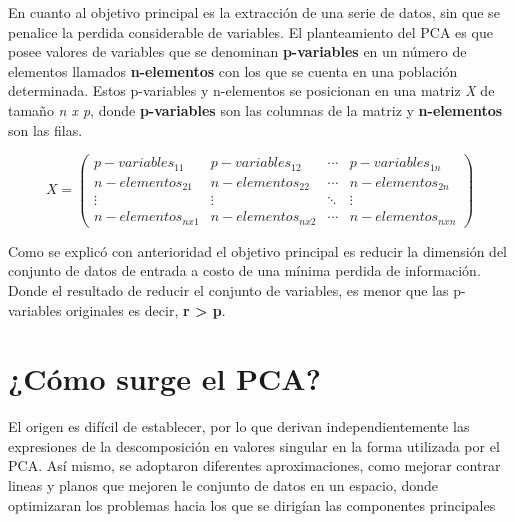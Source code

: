 En cuanto al objetivo principal es la extracción de una serie de datos, sin que se penalice la perdida considerable de variables. El planteamiento del PCA es que posee valores de variables que se denominan \textbf{p-variables} en un número de elementos llamados \textbf{n-elementos} con los que se cuenta en una población determinada. Estos p-variables y n-elementos se posicionan en una matriz \textit{X} de tamaño \textit{n x p}, donde \textbf{p-variables} son las columnas de la matriz y \textbf{n-elementos} son las filas. 

$$ X = \begin{pmatrix} p-variables_{11} &  p-variables_{12}  &     \cdots   &    p-variables_{1n}\\
                      n-elementos_{21} &  n-elementos_{22}  &   \cdots  &    n-elementos_{2n} \\
                        \vdots    &  \vdots  &   \ddots  & \vdots  \\
                        n-elementos_{nx1}    &  n-elementos_{nx2}   & \cdots &   n-elementos_{nxn}
       \end{pmatrix}$$

Como se explicó con anterioridad el objetivo principal es reducir la dimensión del conjunto de datos de entrada a costo de una mínima perdida de información. Donde el resultado de reducir el conjunto de variables, es menor que las p-variables originales es decir, \textbf{r > p}. 


 
 \section{¿Cómo surge el PCA?}
El origen es difícil de establecer, por lo que derivan independientemente las expresiones de la descomposición en valores singular en la forma utilizada por el PCA. Así mismo, se adoptaron diferentes aproximaciones, como mejorar contrar lineas y planos que mejoren le conjunto de datos en un espacio, donde optimizaran los problemas hacia los que se dirigían las componentes principales \cite{andresSanchesMangas}

